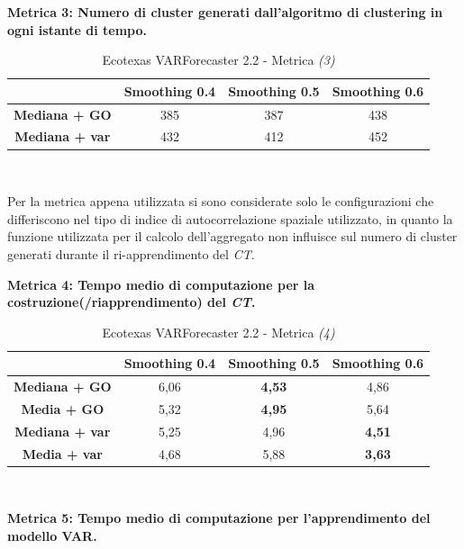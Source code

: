 \documentclass[12pt,a4paper,oneside,openright]{book}
\begin{document}
\textbf{Metrica 3: Numero di cluster generati dall'algoritmo di clustering in ogni istante di tempo.}

\medskip

\begin{table}[H]
\centering
\begin{tabular}[H]{|c|c|c|c|}
\hline
& Smoothing 0.4 & Smoothing 0.5 & Smoothing 0.6\\
\hline
\textbf{Mediana + GO} & 385 & 387 & 438\\ 
\hline
\textbf{Mediana + var} & 432 & 412 & 452\\ 
\hline
\end{tabular} \\
\caption{Ecotexas VARForecaster 2.2 - Metrica \textit{(3)}}
\end{table}

\medskip

Per la metrica appena utilizzata si sono considerate solo le configurazioni che differiscono nel tipo di indice di autocorrelazione spaziale utilizzato, in quanto la funzione utilizzata per il calcolo dell'aggregato non influisce sul numero di cluster generati durante il ri-apprendimento del \textit{CT}.

\medskip

\textbf{Metrica 4: Tempo medio di computazione per la costruzione(/riapprendimento) del \textit{CT}.}

\medskip

\begin{table}[H]
\centering
\begin{tabular}[H]{|c|c|c|c|}
\hline
& Smoothing 0.4 & Smoothing 0.5 & Smoothing 0.6\\
\hline
\textbf{Mediana + GO} & 6,06 & \textbf{4,53} & 4,86\\ 
\hline
\textbf{Media + GO} & 5,32 & \textbf{4,95} & 5,64\\ 
\hline
\textbf{Mediana + var} & 5,25 & 4,96 & \textbf{4,51}\\ 
\hline
\textbf{Media + var} & 4,68 & 5,88 & \textbf{3,63}\\ 
\hline
\end{tabular} \\
\caption{Ecotexas VARForecaster 2.2 - Metrica \textit{(4)}}
\end{table}

\medskip

\textbf{Metrica 5: Tempo medio di computazione per l'apprendimento del modello VAR.}

\medskip
\end{document}

